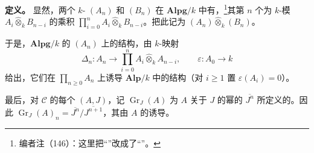 \textbf{定义。} 显然，两个 $k$- $(A_n)$ 和 $(B_n)$ 在 $\mathbf{Alpg}/k$ 中有，\footnote{编者注（146）：这里把“”改成了“”。}其第 $n$ 个为 $k$-模 $A_i\widehat\otimes_k B_{n-i}$ 的乘积 $\prod_{i=0}^n A_i\widehat\otimes_k B_{n-i}$。把此记为 $(A_n)\widehat\otimes_k(B_n)$。

于是，$\mathbf{Alpg}/k$ 的 $(A_n)$ 上的结构，由 $k$-映射
\[
\Delta_n:A_n\longrightarrow\prod_{i=0}^n A_i\widehat\otimes_k A_{n-i},\qquad
\varepsilon:A_0\longrightarrow k
\]
给出，它们在 $\prod_{n\geq0}A_n$ 上诱导 $\mathbf{Alp}/k$ 中的结构（对 $i\geq1$ 置 $\varepsilon(A_i)=0$）。

最后，对 $\mathcal C$ 的每个 $(A,J)$，记 $\operatorname{Gr}_J(A)$ 为 $A$ 关于 $J$ 的幂的 $\overline{J^n}$ 所定义的。因此 $\operatorname{Gr}_J(A)_n=\overline{J^n}/\overline{J^{n+1}}$，其由 $A$ 的诱导。

